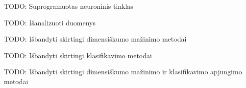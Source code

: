 \documentclass{VUMIFPSbakalaurinis}
\newcommand{\TODO}[1]{
\colorbox{todo-background-color}{TODO: #1}
}
\begin{document}
\TODO{Suprogramuotas neuroninis tinklas}
\TODO{Išanalizuoti duomenys}
\TODO{Išbandyti skirtingi dimensiškumo mažinimo metodai}
\TODO{Išbandyti skirtingi klasifikavimo metodai}
\TODO{Išbandyti skirtingi dimensiškumo mažinimo ir klasifikavimo apjungimo metodai}


\printbibliography[heading=bibintoc]  %

\end{document}
